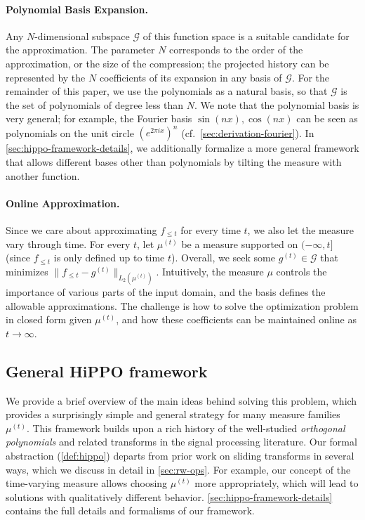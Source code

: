 \documentclass{article}
\begin{document}
\paragraph{Polynomial Basis Expansion.}
Any $N$-dimensional subspace $\mathcal{G}$ of this function space is a suitable candidate for the approximation.
The parameter $N$ corresponds to the order of the approximation, or the size of the compression;
the projected history can be represented by the $N$ coefficients of its expansion in any basis of $\mathcal{G}$.
For the remainder of this paper, we use the polynomials as a natural basis, so that $\mathcal{G}$ is the set of polynomials of degree less than $N$.
We note that the polynomial basis is very general; for example, the Fourier basis $\sin(nx), \cos(nx)$ can be seen as polynomials on the unit circle $(e^{2\pi i x})^n$ (cf.\ \cref{sec:derivation-fourier}).
In \cref{sec:hippo-framework-details}, we additionally formalize a more
general framework that allows different bases other than polynomials by tilting the measure with another function.

\paragraph{Online Approximation.}
Since we care about approximating $f_{\le t}$ for every time $t$, we also let the measure vary through time.
For every $t$, let $\mu^{(t)}$ be a measure supported on $(-\infty, t]$ (since $f_{\le t}$ is only defined up to time $t$).
Overall, we seek some $g^{(t)}\in\mathcal{G}$ that minimizes $\|f_{\le t} - g^{(t)}\|_{L_2(\mu^{(t)})}$.
Intuitively, the measure $\mu$ controls the importance of various parts of the input domain,
and the basis defines the allowable approximations.
The challenge is how to solve the optimization problem in closed form given $\mu^{(t)}$,
and how these coefficients can be maintained online as $t \to \infty$.




\subsection{General HiPPO framework}
\label{subsec:hippo-framework}

We provide a brief overview of the main ideas behind solving this problem, which provides a surprisingly simple and general strategy for many measure families $\mu^{(t)}$.
This framework builds upon a rich history of the well-studied \emph{orthogonal polynomials} and related transforms in the signal processing literature.
Our formal abstraction (\cref{def:hippo}) departs from prior work on sliding transforms in several ways, which we discuss in detail in \cref{sec:rw-ops}.
For example, our concept of the time-varying measure allows choosing $\mu^{(t)}$ more appropriately, which will lead to solutions with qualitatively different behavior.
\cref{sec:hippo-framework-details} contains the full details and formalisms of our framework.
\end{document}
